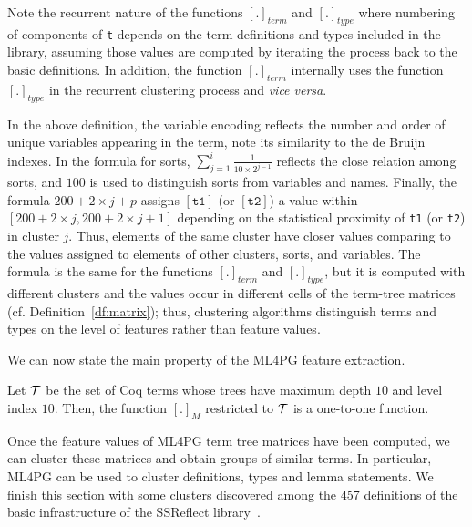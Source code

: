 Note the recurrent nature of the functions $[.]_{term}$ and $[.]_{type}$ where numbering of components of \lstinline?t? depends on the term definitions
and types included in the library, assuming those values are computed by iterating the process back to the basic definitions.  In addition, the function $[.]_{term}$ internally uses the function $[.]_{type}$ in the recurrent clustering 
process and \emph{vice versa}. %

In the above definition, 
the variable encoding reflects the number and order of unique variables appearing in the term, note its similarity to the de Bruijn indexes.
In the formula for sorts, $\sum_{j=1}^i\frac{1}{10\times 2^{j-1}}$ reflects the close relation among sorts, and 
$100$ is used to  distinguish sorts from variables and names. 
Finally, the formula $200+2\times j + p$ assigns $[\texttt{t1}]$ (or $[\texttt{t2}]$) a value within $[200+2\times j,200+2\times j+1]$ depending on the
statistical proximity of \lstinline?t1? (or \lstinline?t2?) in cluster $j$. Thus, elements of the same cluster have closer values comparing to the values 
assigned to elements of other clusters, sorts, and variables. The formula is the same for the functions $[.]_{term}$ and $[.]_{type}$, but it is computed with different 
clusters and the values %
occur in different cells of the term-tree matrices (cf. Definition~\ref{df:matrix}); thus, clustering algorithms distinguish terms and types on the level of features rather than feature values.

We can now state the main property of the ML4PG feature extraction.

\begin{proposition}
Let ${\cal T}$ be the set of Coq terms  whose trees have maximum depth $10$ and level index $10$. 
Then, the function $[.]_{M}$ restricted to ${\cal T}$ is a one-to-one function. 
\end{proposition}

Once the feature values of ML4PG term tree matrices have been computed, we can cluster these matrices and 
obtain groups of similar terms. In particular, ML4PG can be used to cluster definitions, types and lemma 
statements. 
We finish this section with some clusters discovered among the 457 definitions of the basic infrastructure of the SSReflect 
library~\cite{SSReflect}.

